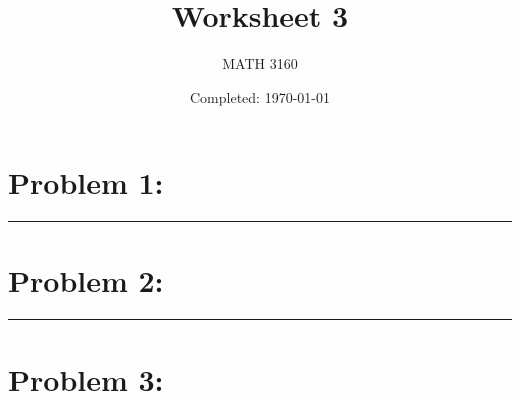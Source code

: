 \documentclass{article}
\title{Worksheet 3}
\author{
  MATH 3160\\
  \myauthor
}
\date{Completed: \today}
\begin{document}
\maketitle %


\section*{Problem 1: }
\hrule %
\newpage
\section*{Problem 2: }
\hrule
\newpage
\section*{Problem 3: }
\end{document}
